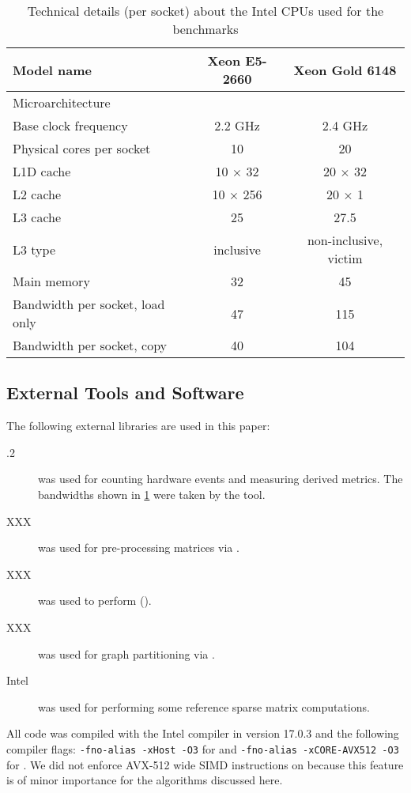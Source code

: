\begin{table}[tbp]
	\footnotesize
	\caption{Technical details (per socket) about the Intel CPUs used for the benchmarks}\label{tab:test_bed}
	\begin{center}
		\begin{tabular}{l|cc}
			{Model name} & {Xeon\textsuperscript{\textregistered} E5-2660} & {Xeon\textsuperscript{\textregistered} Gold 6148} \\\midrule
			{Microarchitecture} & {\IVB} & {\SKX} \\\midrule
			{Base clock frequency} & {2.2 GHz} & {2.4 GHz}\\
			{Physical cores per socket} & {10} & {20} \\
			{L1D cache} & {10 $\times$ 32 \KiB} & {20 $\times$ 32 \KiB}\\
			{L2 cache} & {10 $\times$ 256 \KiB} & {20 $\times$ 1 \MiB} \\
			{L3 cache} & {25 \MiB} & {27.5 \MiB}\\
			{L3 type} & {inclusive} & {non-inclusive, victim}\\
			{Main memory} & {32 \GiB} & {45 \GiB}\\
			{Bandwidth per socket, load only} & {47 \GBS} & {115 \GBS}\\ %
			{Bandwidth per socket, copy} & {40 \GBS} & {104 \GBS}\\
		\end{tabular}
	\end{center}
\end{table} 


\subsection{External Tools and Software}
The following external libraries are used in this paper:
\begin{description}
	\item[.2] \cite{LIKWID}  \likwidPerfctr was used for counting hardware events and measuring derived metrics. The bandwidths shown in \cref{tab:test_bed} were taken by the  \likwidBench tool.
	\item[\COLPACK XXX] \cite{COLPACK} was used for pre-processing matrices via \MCfull.
	\item[\SPMP XXX] \cite{SpMP} was used to perform \RCMfull (\RCM).
	\item[\METIS XXX] \cite{METIS} was used for graph partitioning via \ABMC.
	\item[Intel ] \cite{MKL} was used for performing some reference sparse matrix computations.
\end{description}
All code was compiled with the Intel compiler in version 17.0.3 and the following compiler flags: {\tt -fno-alias -xHost -O3} for \IVB and {\tt -fno-alias -xCORE-AVX512 -O3} for \SKX. We did not enforce AVX-512 wide SIMD instructions on \SKX because this feature is of minor importance for the algorithms discussed here.

